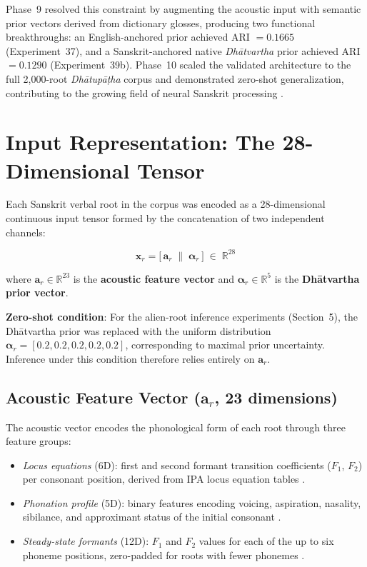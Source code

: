 \documentclass{article}
\begin{document}
Phase~9 resolved this constraint by augmenting the acoustic input with semantic prior
vectors derived from dictionary glosses, producing two functional breakthroughs: an
English-anchored prior achieved ARI $= 0.1665$ (Experiment~37), and a
Sanskrit-anchored native \textit{Dhātvartha} prior achieved ARI $= 0.1290$
(Experiment~39b). Phase~10 scaled the validated architecture to the full 2,000-root
\textit{Dhātupāṭha} corpus and demonstrated zero-shot generalization, contributing to
the growing field of neural Sanskrit processing \citep{isac2025slip,deluca2025accessible}.

\section{Input Representation: The 28-Dimensional Tensor}

Each Sanskrit verbal root in the corpus was encoded as a 28-dimensional continuous
input tensor formed by the concatenation of two independent channels:

\begin{equation}
  \mathbf{x}_r = \bigl[\,\mathbf{a}_r \;\|\; \boldsymbol{\alpha}_r\,\bigr]
  \;\in\; \mathbb{R}^{28}
  \label{eq:tensor}
\end{equation}

\noindent where $\mathbf{a}_r \in \mathbb{R}^{23}$ is the \textbf{acoustic feature
vector} and $\boldsymbol{\alpha}_r \in \mathbb{R}^{5}$ is the \textbf{Dhātvartha prior
vector}.

\textbf{Zero-shot condition}: For the alien-root inference experiments (Section~5), the
Dhātvartha prior was replaced with the uniform distribution $\boldsymbol{\alpha}_r =
[0.2, 0.2, 0.2, 0.2, 0.2]$, corresponding to maximal prior uncertainty. Inference under
this condition therefore relies entirely on $\mathbf{a}_r$.

\subsection{Acoustic Feature Vector ($\mathbf{a}_r$, 23 dimensions)}

The acoustic vector encodes the phonological form of each root through three feature
groups:

\begin{itemize}[noitemsep]
  \item \textit{Locus equations} (6D): first and second formant transition coefficients
    ($F_1$, $F_2$) per consonant position, derived from IPA locus equation tables
    \citep{sussman1991,fant1960}.
  \item \textit{Phonation profile} (5D): binary features encoding voicing, aspiration,
    nasality, sibilance, and approximant status of the initial consonant
    \citep{liberman1967,liberman1985}.
  \item \textit{Steady-state formants} (12D): $F_1$ and $F_2$ values for each of the up
    to six phoneme positions, zero-padded for roots with fewer phonemes
    \citep{peterson1952,fant1960}.
\end{itemize}
\end{document}
